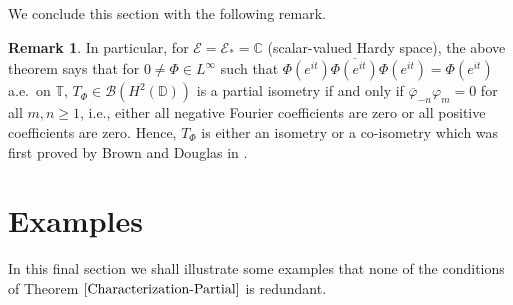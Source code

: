 \documentclass[12pt]{amsart}
\newcommand{\clb}{\mathcal{B}}
\newcommand{\cle}{\mathcal{E}}
\newcommand{\C}{\mathbb{C}}
\newcommand{\D}{\mathbb{D}}
\newcommand{\T}{\mathbb{T}}
\theoremstyle{definition}
\theoremstyle{plain}
\theoremstyle{definition}
\newtheorem{rem}[thm]{Remark}
\numberwithin{equation}{section}
\let\phi=\varphi
\begin{document}
We conclude this section with the following remark.
\begin{rem}
In particular, for $\cle=\cle_*=\C$ (scalar-valued Hardy space), the above theorem says that for $0\neq \Phi \in L^\infty$ such that $\Phi(e^{it})\overline{\Phi(e^{it})}\Phi(e^{it})=\Phi(e^{it})$ a.e.\ on $\T$, $T_\Phi \in \clb(H^2(\D))$ is a partial isometry if and only if $\overline{\phi}_{-n}\phi_m=0$ for all $m,n \geq 1$, i.e., either all negative Fourier coefficients are zero or all positive coefficients are zero. Hence, $T_\Phi$ is either an isometry or a co-isometry which was first proved by Brown and Douglas in \cite{BD-Partially}.
\end{rem}





\section{Examples}{\label{sec5}}
In this final section we shall illustrate some examples that none of the  conditions of Theorem $\ref{Characterization-Partial}$ is redundant.
\end{document}

